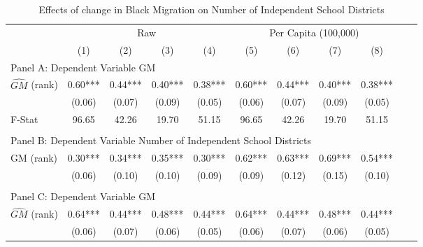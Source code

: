  \begin{table}[htbp]\centering {} \begin{threeparttable} \caption{Effects of change in Black Migration on Number of Independent School Districts} \begin{tabular}{l*{10}{c}} \toprule
                &\multicolumn{4}{c}{Raw}                                    &\multicolumn{4}{c}{Per Capita (100,000)}                   \\\cmidrule(lr){2-5}\cmidrule(lr){6-9}
                &\multicolumn{1}{c}{(1)}   &\multicolumn{1}{c}{(2)}   &\multicolumn{1}{c}{(3)}   &\multicolumn{1}{c}{(4)}   &\multicolumn{1}{c}{(5)}   &\multicolumn{1}{c}{(6)}   &\multicolumn{1}{c}{(7)}   &\multicolumn{1}{c}{(8)}   \\
\cmidrule(lr){1-9}
\multicolumn{8}{l}{Panel A: Dependent Variable GM}\\
\cmidrule(lr){1-9}
$\hat{GM}$ (rank)&       0.60***&       0.44***&       0.40***&       0.38***&       0.60***&       0.44***&       0.40***&       0.38***\\
                &     (0.06)   &     (0.07)   &     (0.09)   &     (0.05)   &     (0.06)   &     (0.07)   &     (0.09)   &     (0.05)   \\
\midrule
F-Stat          &      96.65   &      42.26   &      19.70   &      51.15   &      96.65   &      42.26   &      19.70   &      51.15   \\
\cmidrule[\heavyrulewidth](lr){1-9} \\ \cmidrule[\heavyrulewidth](lr){1-9}
\multicolumn{8}{l}{Panel B: Dependent Variable Number of Independent School Districts}\\
\cmidrule(lr){1-9}
GM  (rank)      &       0.30***&       0.34***&       0.35***&       0.30***&       0.62***&       0.63***&       0.69***&       0.54***\\
                &     (0.06)   &     (0.10)   &     (0.10)   &     (0.09)   &     (0.09)   &     (0.12)   &     (0.15)   &     (0.10)   \\
\cmidrule[\heavyrulewidth](lr){1-9} \\ \cmidrule[\heavyrulewidth](lr){1-9}
\multicolumn{8}{l}{Panel C: Dependent Variable GM}\\
\cmidrule(lr){1-9}
$\hat{GM}$ (rank)&       0.64***&       0.44***&       0.48***&       0.44***&       0.64***&       0.44***&       0.48***&       0.44***\\
                &     (0.06)   &     (0.07)   &     (0.06)   &     (0.05)   &     (0.06)   &     (0.07)   &     (0.06)   &     (0.05)   \\

\end{tabular}
\end{threeparttable}
\end{table}
